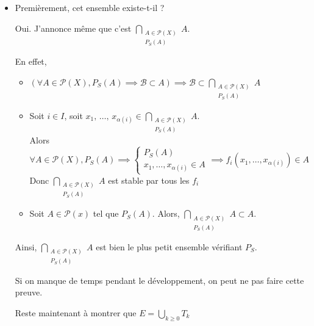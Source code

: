 \begin{itemize}[label=$\star$]
	\item Premièrement, cet ensemble existe-t-il ?

	Oui. J'annonce même que c'est $\bigcap\limits_{\substack{A \in \mathcal P(X) \\ P_S(A)}} A$.
	
	En effet,\begin{itemize}[label=$\bullet$]
		\item $\left(\forall A \in \mathcal P(X), P_S(A) \implies \mathcal B \subset A \right) \implies \mathcal B \subset \bigcap\limits_{\substack{A \in \mathcal P(X) \\ P_S(A)}} A$
		
		\item Soit $i\in I$, soit $x_1, \, \dots, \, x_{\alpha(i)} \in \bigcap\limits_{\substack{A \in \mathcal P(X) \\ P_S(A)}} A$.\\
		Alors $\forall A \in \mathcal P(X), P_S(A) \implies \left\{ \begin{array}{l}
		P_S(A) \\ x_1, \dots, x_{\alpha(i)} \in A 
		\end{array}\right.\implies f_i\left(x_1, \dots, x_{\alpha(i)}\right) \in A$\\
		Donc $\bigcap\limits_{\substack{A \in \mathcal P(X) \\ P_S(A)}} A$ est stable par tous les $f_i$
		
		\item Soit $A \in \mathcal P(x)$ tel que $P_S(A)$. Alors, $\bigcap\limits_{\substack{A \in \mathcal P(X) \\ P_S(A)}} A \subset A$.
		
	\end{itemize}
	Ainsi, $\bigcap\limits_{\substack{A \in \mathcal P(X) \\ P_S(A)}} A$ est bien le plus petit ensemble vérifiant $P_S$.
	\begin{com}
		Si on manque de temps pendant le développement, on peut ne pas faire cette preuve.
	\end{com}

	Reste maintenant à montrer que $E = \bigcup\limits_{k \geq 0} T_k$
	

\end{itemize}
